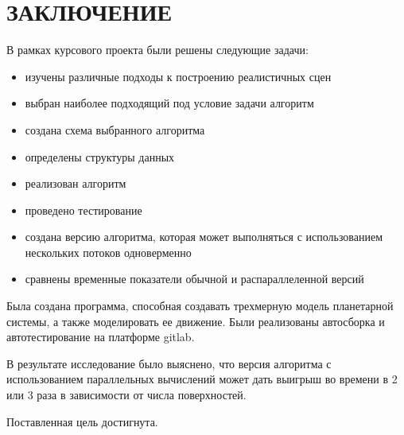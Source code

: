 \chapter*{ЗАКЛЮЧЕНИЕ}

В рамках курсового проекта были решены следующие задачи:
\begin{itemize}
	\item изучены различные подходы к построению реалистичных сцен
	\item выбран наиболее подходящий под условие задачи алгоритм
	\item создана схема выбранного алгоритма
	\item определены структуры данных
	\item реализован алгоритм
	\item проведено тестирование
	\item создана версию алгоритма, которая может выполняться с использованием нескольких потоков одноверменно
	\item сравнены временные показатели обычной и распараллеленной версий
\end{itemize}

Была создана программа, способная создавать трехмерную модель планетарной системы, а также моделировать ее движение. Были реализованы автосборка и автотестирование на платформе gitlab.

В результате исследование было выяснено, что версия алгоритма с использованием параллельных вычислений может дать выигрыш во времени в 2 или 3 раза в зависимости от числа поверхностей.

Поставленная цель достигнута.